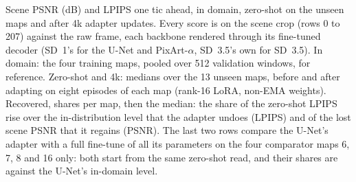 \caption{Scene PSNR (dB) and LPIPS one tic ahead, in domain, zero-shot on the unseen maps and after 4k adapter updates. Every score is on the scene crop (rows 0 to 207) against the raw frame, each backbone rendered through its fine-tuned decoder (SD~1's for the U-Net and PixArt-$\alpha$, SD~3.5's own for SD~3.5). In domain: the four training maps, pooled over 512 validation windows, for reference. Zero-shot and 4k: medians over the 13 unseen maps, before and after adapting on eight episodes of each map (rank-16 LoRA, non-EMA weights). Recovered, shares per map, then the median: the share of the zero-shot LPIPS rise over the in-distribution level that the adapter undoes (LPIPS) and of the lost scene PSNR that it regains (PSNR). The last two rows compare the U-Net's adapter with a full fine-tune of all its parameters on the four comparator maps 6, 7, 8 and 16 only: both start from the same zero-shot read, and their shares are against the U-Net's in-domain level.}
